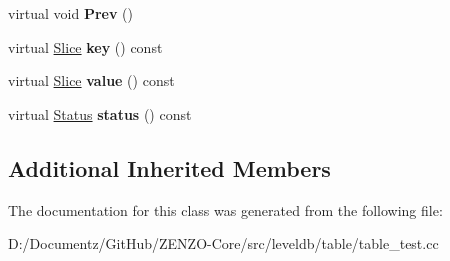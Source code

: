 \begin{DoxyCompactItemize}
virtual void {\bfseries Prev} ()
\item 
\mbox{\label{classleveldb_1_1_key_converting_iterator_a9ea8cbecf7b3219f7f26d4cdcd2e0394}} 
virtual \mbox{\hyperlink{classleveldb_1_1_slice}{Slice}} {\bfseries key} () const
\item 
\mbox{\label{classleveldb_1_1_key_converting_iterator_a83a4624444e595e80fc8a944258f1a0c}} 
virtual \mbox{\hyperlink{classleveldb_1_1_slice}{Slice}} {\bfseries value} () const
\item 
\mbox{\label{classleveldb_1_1_key_converting_iterator_aad6b59aa59646db0410d53b72540b834}} 
virtual \mbox{\hyperlink{classleveldb_1_1_status}{Status}} {\bfseries status} () const
\end{DoxyCompactItemize}
\subsection*{Additional Inherited Members}


The documentation for this class was generated from the following file\+:\begin{DoxyCompactItemize}
\item 
D\+:/\+Documentz/\+Git\+Hub/\+Z\+E\+N\+Z\+O-\/\+Core/src/leveldb/table/table\+\_\+test.\+cc\end{DoxyCompactItemize}
